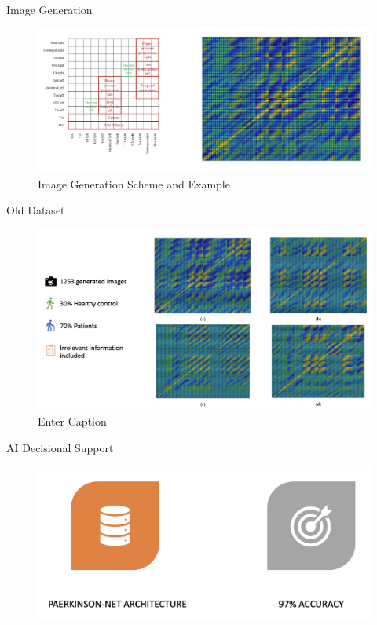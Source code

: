 \documentclass[aspectratio=169,xcolor=dvipsnames]{beamer}
\begin{document}
\begin{frame}{Image Generation}
\begin{figure}
    \centering
    \includegraphics[width=0.95\linewidth]{image.png}
    \caption{Image Generation Scheme and Example}
    \label{fig:enter-label}
\end{figure}
\end{frame}


\begin{frame}{Old Dataset}
    \begin{figure}
        \centering
        \includegraphics[width=0.99\linewidth]{Screenshot 2025-02-25 at 18.20.25.png}
        \caption{Enter Caption}
        \label{fig:enter-label}
    \end{figure}
\end{frame}


\begin{frame}{AI Decisional Support}
    \begin{figure}
        \centering
        \includegraphics[width=0.99\linewidth]{models.png}
    \end{figure}
\end{frame}
\end{document}
